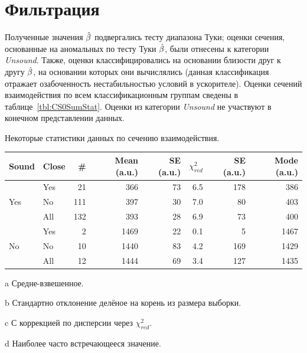 \documentclass{article}
\begin{document}
	\section{Фильтрация}
	Полученные значения $\slp*$ подвергались тесту диапазона Туки; оценки сечения, основанные на аномальных по тесту Туки $\slp*$, были отнесены к категории \emph{Unsound}. Также, оценки классифицировались на основании близости друг к другу $\slp*$, на основании которых они вычислялись (данная классификация отражает озабоченность нестабильностью условий в ускорителе). Оценки сечений взаимодействия по всем классификационным группам сведены в таблице~\ref{tbl:CS0SumStat}. Оценки из категории \emph{Unsound} не участвуют в конечном представлении данных.
	
	\begin{center}
		\begin{threeparttable}[h!]
			\centering
			\caption{Некоторые статистики данных по сечению взаимодействия.\label{tbl:CS0SumStat}}
			\begin{tabular}{llrrrrrr}
				\hline\hline
				Sound                & Close &  \# & Mean\tnote{a} (a.u.) & SE\tnote{b} (a.u.) & $\chi^2_{red}$ & SE\tnote{c} (a.u.) &  Mode\tnote{d} (a.u.)\\ \hline
				\multirow{3}{*}{Yes} & Yes   &  21 &                  366 &                 73 &            6.5 &                178 &  386 \\
				& No    & 111 &                  397 &                 30 &            7.0 &                 80 &  403 \\
				& All   & 132 &                  393 &                 28 &            6.9 &                 73 &  400 \\ \hline
				\multirow{3}{*}{No}  & Yes   &   2 &                 1469 &                 22 &            0.1 &                  5 & 1467 \\
				& No    &  10 &                 1440 &                 83 &            4.2 &                169 & 1429 \\
				& All   &  12 &                 1444 &                 69 &            3.4 &                127 & 1435 \\ \hline
			\end{tabular}
			\begin{tablenotes}
				\item[a]{Средне-взвешенное.}
				\item[b]{Стандартно отклонение делёное на корень из размера выборки.}
				\item[c]{С коррекцией по дисперсии через $\chi^2_{red}$.}
				\item[d]{Наиболее часто встречающееся значение.}
			\end{tablenotes}
		\end{threeparttable}
	\end{center}
	
\end{document}
